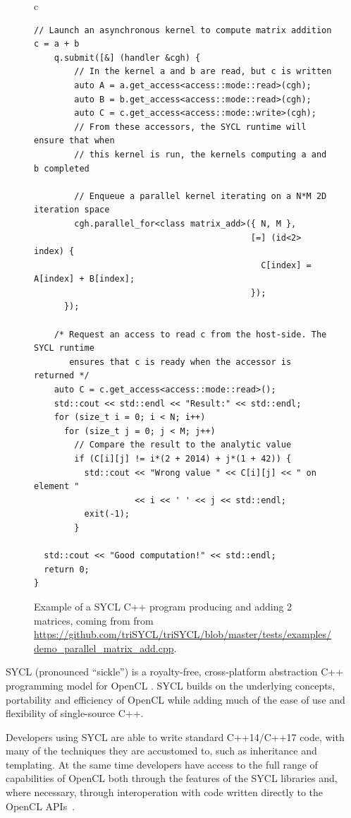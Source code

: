 \documentclass[sigplan, review]{acmart}
\begin{document}
\begin{figure}
\begin{tabular}{c}
\begin{lstlisting}[basicstyle=\scriptsize]
  // Launch an asynchronous kernel to compute matrix addition c = a + b
    q.submit([&] (handler &cgh) {
        // In the kernel a and b are read, but c is written
        auto A = a.get_access<access::mode::read>(cgh);
        auto B = b.get_access<access::mode::read>(cgh);
        auto C = c.get_access<access::mode::write>(cgh);
        // From these accessors, the SYCL runtime will ensure that when
        // this kernel is run, the kernels computing a and b completed

        // Enqueue a parallel kernel iterating on a N*M 2D iteration space
        cgh.parallel_for<class matrix_add>({ N, M },
                                           [=] (id<2> index) {
                                             C[index] = A[index] + B[index];
                                           });
      });

    /* Request an access to read c from the host-side. The SYCL runtime
       ensures that c is ready when the accessor is returned */
    auto C = c.get_access<access::mode::read>();
    std::cout << std::endl << "Result:" << std::endl;
    for (size_t i = 0; i < N; i++)
      for (size_t j = 0; j < M; j++)
        // Compare the result to the analytic value
        if (C[i][j] != i*(2 + 2014) + j*(1 + 42)) {
          std::cout << "Wrong value " << C[i][j] << " on element "
                    << i << ' ' << j << std::endl;
          exit(-1);
        }

  std::cout << "Good computation!" << std::endl;
  return 0;
}
    \end{lstlisting}
  \end{tabular}
  \caption{Example of a SYCL C++ program producing and adding 2
    matrices, coming from from
    \url{https://github.com/triSYCL/triSYCL/blob/master/tests/examples/demo_parallel_matrix_add.cpp}.\label{fig:SYCL-example}}
\end{figure}

SYCL \cite{SYCL-1.2,SYCL-2.2-provisional} (pronounced ``sickle'') is a
royalty-free, cross-platform abstraction C++ programming model for
OpenCL \cite{OpenCL-API-2.2-provisional,
  OpenCL-C++-2.2-provisional}. SYCL builds on the underlying concepts,
portability and efficiency of OpenCL while adding much of the ease of
use and flexibility of single-source C++.

Developers using SYCL are able to write standard C++14/C++17 code,
with many of the techniques they are accustomed to, such as
inheritance and templating. At the same time developers have access to
the full range of capabilities of OpenCL both through the features of
the SYCL libraries and, where necessary, through interoperation with
code written directly to the OpenCL
APIs~\cite{OpenCL-API-2.2-provisional}.
\end{document}
